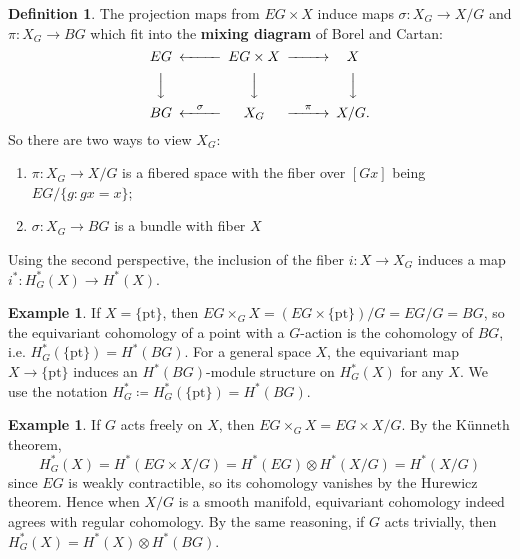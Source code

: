 \documentclass{report}
\theoremstyle{plain}
\theoremstyle{definition}
\newtheorem{definition}[theorem]{Definition}
\newtheorem{example}[theorem]{Example}
\theoremstyle{remark}
\newcommand{\pt}{\mathrm{pt}}
\begin{document}
\begin{definition}
  The projection maps from $EG \times X$ induce maps $\sigma\colon X_G
  \to X/G$ and $\pi\colon X_G \to BG$ which fit into the {\bf mixing
    diagram} of Borel and Cartan:
  \[ \begin{CD}
    EG @<<< EG \times X @>>> X   \\
    @VVV        @VVV        @VVV \\
    BG @<\sigma<< X_G @>\pi>> X/G.
  \end{CD} \]
  So there are two ways to view $X_G$:
  \begin{enumerate}
  \item $\pi\colon X_G \to X/G$ is a fibered space with the fiber over
    $[Gx]$ being $EG/\{g : gx = x\}$;
  \item $\sigma\colon X_G \to BG$ is a bundle with fiber $X$
  \end{enumerate}
  Using the second perspective, the inclusion of the fiber $i\colon X
  \to X_G$ induces a map $i^*\colon H^*_G(X) \to H^*(X)$.
\end{definition}

\begin{example} \label{ex:eqcoh-point}
  If $X = \{\pt\}$, then $EG \times_G X = (EG \times \{\pt\}) / G =
  EG/G = BG$, so the equivariant cohomology of a point with a
  $G$-action is the cohomology of $BG$, i.e. $H^*_G(\{\pt\}) =
  H^*(BG)$. For a general space $X$, the equivariant map $X \to
  \{\pt\}$ induces an $H^*(BG)$-module structure on $H^*_G(X)$ for any
  $X$. We use the notation $H^*_G \coloneqq H^*_G(\{\pt\}) = H^*(BG)$.
\end{example}

\begin{example} \label{ex:eqcoh-free}
  If $G$ acts freely on $X$, then $EG \times_G X = EG \times X/G$. By
  the K\"unneth theorem,
  \[ H^*_G(X) = H^*(EG \times X/G) = H^*(EG) \otimes H^*(X/G) = H^*(X/G) \]
  since $EG$ is weakly contractible, so its cohomology vanishes by the
  Hurewicz theorem. Hence when $X/G$ is a smooth manifold, equivariant
  cohomology indeed agrees with regular cohomology. By the same
  reasoning, if $G$ acts trivially, then $H^*_G(X) = H^*(X) \otimes
  H^*(BG)$.
\end{example}
\end{document}
